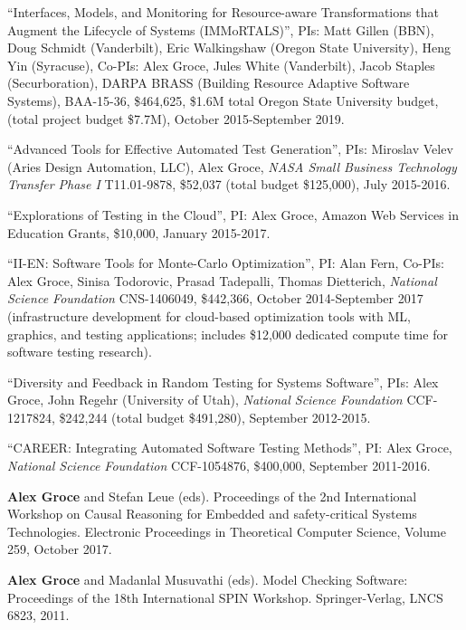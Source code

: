 \documentclass[ComputerScience]{vita}
\begin{document}
\begin{vita}
\begin{Funding}
\item ``Interfaces, Models, and Monitoring for Resource-aware Transformations that Augment the Lifecycle of Systems (IMMoRTALS)'', PIs: Matt Gillen (BBN), Doug Schmidt (Vanderbilt), Eric Walkingshaw (Oregon State University), Heng Yin (Syracuse), Co-PIs: Alex Groce, Jules White (Vanderbilt), Jacob Staples (Securboration), DARPA BRASS (Building Resource Adaptive Software Systems), BAA-15-36, \$464,625, \$1.6M total Oregon State University budget, (total project budget \$7.7M), October 2015-September 2019.
\item ``Advanced Tools for Effective Automated Test Generation'', PIs: Miroslav Velev (Aries Design Automation, LLC), Alex Groce, \emph{NASA Small Business Technology Transfer Phase I} T11.01-9878, \$52,037 (total budget \$125,000), July 2015-2016.
\item ``Explorations of Testing in the Cloud'', PI: Alex Groce, Amazon Web Services in Education Grants, \$10,000, January 2015-2017.
\item ``II-EN: Software Tools for Monte-Carlo Optimization'', PI: Alan Fern, Co-PIs: Alex Groce, Sinisa Todorovic, Prasad Tadepalli, Thomas Dietterich, \emph{National Science Foundation} CNS-1406049, \$442,366, October 2014-September 2017 (infrastructure development for cloud-based optimization tools with ML, graphics, and testing applications; includes \$12,000 dedicated compute time for software testing research).
\item ``Diversity and Feedback in Random Testing for Systems Software'', PIs: Alex Groce, John Regehr (University of Utah), \emph{National Science Foundation} CCF-1217824, \$242,244 (total budget \$491,280), September 2012-2015.
\item ``CAREER: Integrating Automated Software Testing Methods'', PI: Alex Groce, \emph{National Science Foundation} CCF-1054876, \$400,000, September 2011-2016.
\end{Funding}

\begin{Books, Edited Volumes}

\item
{\bf Alex Groce} and Stefan Leue (eds).
\newblock Proceedings of the 2nd International Workshop on 
Causal Reasoning for Embedded and safety-critical Systems Technologies.
\newblock Electronic Proceedings in Theoretical Computer Science, Volume 259, October 2017.

\item
{\bf Alex Groce} and Madanlal Musuvathi (eds).
\newblock Model Checking Software: Proceedings of the 18th International SPIN Workshop.
\newblock Springer-Verlag, LNCS 6823, 2011. 


\end{Books, Edited Volumes}
\end{vita}
\end{document}
